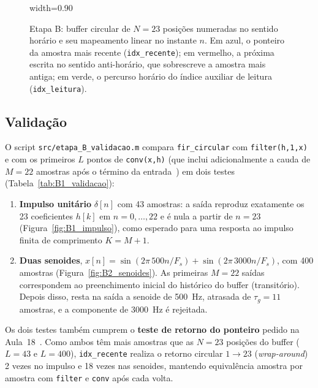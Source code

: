 \documentclass[11pt,a4paper]{article}
\begin{document}
\begin{figure}[!htbp]
\begin{adjustbox}{width=0.90\textwidth}
    \end{adjustbox}
    \caption{Etapa B: buffer circular de $N = 23$ posições numeradas no sentido horário e seu mapeamento linear no instante $n$. Em azul, o ponteiro da amostra mais recente (\texttt{idx\_recente}); em vermelho, a próxima escrita no sentido anti-horário, que sobrescreve a amostra mais antiga; em verde, o percurso horário do índice auxiliar de leitura (\texttt{idx\_leitura}).}
    \label{fig:tikz_buffer}
\end{figure}

\subsection{Validação}

O script \texttt{src/etapa\_B\_validacao.m} compara \texttt{fir\_circular} com \texttt{filter(h,1,x)} e com os primeiros $L$ pontos de \texttt{conv(x,h)} (que inclui adicionalmente a cauda de $M = 22$ amostras após o término da entrada~\cite{aula18}) em dois testes (Tabela~\ref{tab:B1_validacao}):
\begin{enumerate}[leftmargin=1.5em, itemsep=2pt]
    \item \textbf{Impulso unitário} $\delta[n]$ com 43 amostras: a saída reproduz exatamente os 23 coeficientes $h[k]$ em $n = 0, \dots, 22$ e é nula a partir de $n = 23$ (Figura~\ref{fig:B1_impulso}), como esperado para uma resposta ao impulso finita de comprimento $K = M + 1$.
    \item \textbf{Duas senoides}, $x[n] = \sin(2\pi\,500n/F_s) + \sin(2\pi\,3000n/F_s)$, com 400 amostras (Figura~\ref{fig:B2_senoides}). As primeiras $M = 22$ saídas correspondem ao preenchimento inicial do histórico do buffer (transitório). Depois disso, resta na saída a senoide de \SI{500}{Hz}, atrasada de $\tau_g = 11$ amostras, e a componente de \SI{3000}{Hz} é rejeitada.
\end{enumerate}
Os dois testes também cumprem o \textbf{teste de retorno do ponteiro} pedido na Aula~18~\cite{aula18}. Como ambos têm mais amostras que as $N = 23$ posições do buffer ($L = 43$ e $L = 400$), \texttt{idx\_recente} realiza o retorno circular $1 \to 23$ (\textit{wrap-around}) 2 vezes no impulso e 18 vezes nas senoides, mantendo equivalência amostra por amostra com \texttt{filter} e \texttt{conv} após cada volta.
\end{document}
